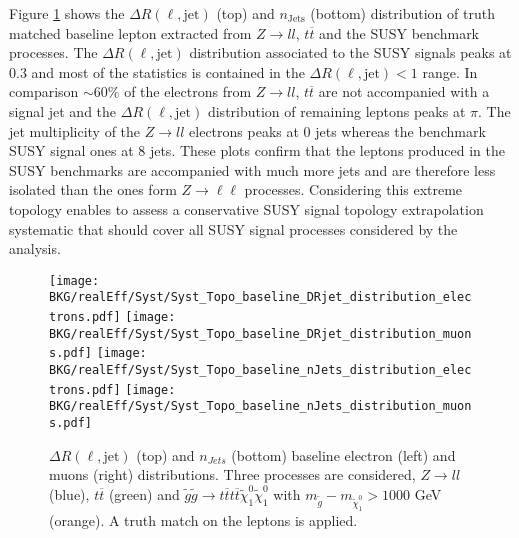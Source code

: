 	
	Figure \ref{fig:Syst_topo} shows the $\Delta R(\ell,\mathrm{jet})$ (top) and $n_{\mathrm{Jets}}$ (bottom) distribution of truth matched baseline lepton extracted from $Z \rightarrow ll$, $t\overline{t}$ and the SUSY benchmark processes. The $\Delta R(\ell,\mathrm{jet})$ distribution associated to the SUSY signals peaks at 0.3 and most of the statistics is contained in the $\Delta R(\ell,\mathrm{jet}) < 1$ range. In comparison $\sim 60\%$ of the electrons from $Z \rightarrow ll$, $t\overline{t}$ are not accompanied with a signal jet and the $\Delta R(\ell,\mathrm{jet})$ distribution of remaining leptons peaks at $\pi$. The jet multiplicity of the $Z\rightarrow ll$ electrons peaks at 0 jets whereas the benchmark SUSY signal ones at 8 jets. These plots confirm that the leptons produced in the SUSY benchmarks are accompanied with much more jets and are therefore less isolated than the ones form $Z\rightarrow \ell\ell$ processes. Considering this extreme topology enables to assess a conservative SUSY signal topology extrapolation systematic that should cover all SUSY signal processes considered by the analysis.
	
	
\begin{figure}[!h]
	\begin{center} 
	   \texttt{[image: BKG/realEff/Syst/Syst\_Topo\_baseline\_DRjet\_distribution\_electrons.pdf]} 
	   \texttt{[image: BKG/realEff/Syst/Syst\_Topo\_baseline\_DRjet\_distribution\_muons.pdf]}
	   \texttt{[image: BKG/realEff/Syst/Syst\_Topo\_baseline\_nJets\_distribution\_electrons.pdf]} 
	   \texttt{[image: BKG/realEff/Syst/Syst\_Topo\_baseline\_nJets\_distribution\_muons.pdf]}
	   \caption{\label{fig:Syst_topo} $\Delta R(\ell,\mathrm{jet})$ (top) and $n_{Jets}$ (bottom) baseline electron (left) and muons (right) distributions. Three processes are considered, $Z\rightarrow ll$ (blue), $t\overline{t}$ (green) and  $\tilde{g}\tilde{g} \rightarrow t\overline{t}t\overline{t} \tilde{\chi}^0_1 \tilde{\chi}^0_1$ with $m_{\tilde{g}} - m_{\tilde{\chi}^0_1} > 1000$ GeV (orange). A truth match on the leptons is applied.}
	\end{center}
\end{figure}	



